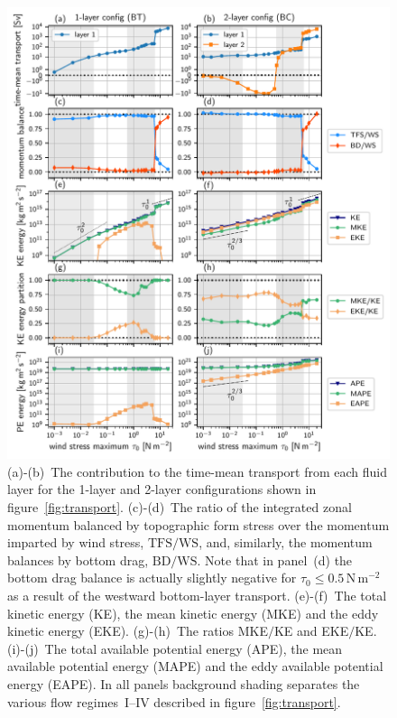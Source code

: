 \documentclass{agujournal2019}
\newcommand{\Pa}		{\mathrm{N}\,\mathrm{m}^{-2}}
\newcommand{\ws} {\mathrm{WS}}
\newcommand{\tfs} {\mathrm{TFS}}
\newcommand{\bd} {\mathrm{BD}}
\begin{document}
\begin{figure}
\centering
\noindent\includegraphics[width=\textwidth]{transp_mombal_KE_APE}
\caption{(a)-(b)~The contribution to the time-mean transport from each fluid layer for the 1-layer and 2-layer configurations shown in figure~\ref{fig:transport}. (c)-(d)~The ratio of the integrated zonal momentum balanced by topographic form stress over the momentum imparted by wind stress, $\tfs/\ws$, and, similarly, the momentum balances by bottom drag, $\bd/\ws$. Note that in panel~(d) the bottom drag balance is actually slightly negative for $\tau_0\le 0.5\,\Pa$ as a result of the westward bottom-layer transport. (e)-(f)~The total kinetic energy (KE), the mean kinetic energy (MKE) and the eddy kinetic energy (EKE). (g)-(h)~The ratios  MKE$/$KE and EKE$/$KE. {\color{black}(i)-(j)~The total available potential energy (APE), the mean available potential energy (MAPE) and the eddy available potential energy (EAPE). } In all panels background shading separates the various flow regimes~I--IV described in figure~\ref{fig:transport}.}\label{fig:transportdecomp}\vspace*{-3em}
\end{figure}
\end{document}
